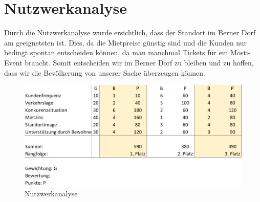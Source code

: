 \documentclass[a4paper, titlepage]{article}
\begin{document}
\section{Nutzwerkanalyse}
Durch die Nutzwerkanalyse wurde ersichtlich, dass der Standort im Berner Dorf am geeignetsten ist. 
Dies, da die Mietpreise günstig sind und die Kunden nur bedingt spontan entscheiden können, da man manchmal Tickets für ein Mosti-Event braucht.
Somit entscheiden wir im Berner Dorf zu bleiben und zu hoffen, dass wir die Bevölkerung von unserer Sache überzeugen können.

\begin{figure}[h]
  \includegraphics[width=\textwidth]{nutzwerkanalyse}
  \caption{Nutzwerkanalyse}
\end{figure}
\end{document}
